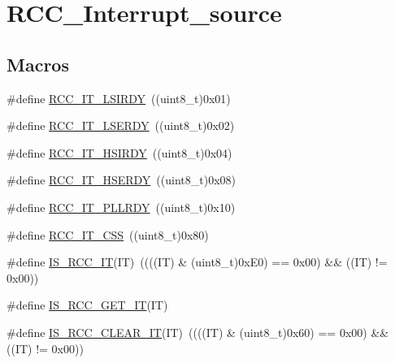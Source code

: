\hypertarget{group___r_c_c___interrupt__source}{}\section{R\+C\+C\+\_\+\+Interrupt\+\_\+source}
\label{group___r_c_c___interrupt__source}
\subsection*{Macros}
\begin{DoxyCompactItemize}
\item 
\#define \mbox{\hyperlink{group___r_c_c___interrupt__source_ga2b4ef277c1b71f96e0bef4b9a72fca94}{R\+C\+C\+\_\+\+I\+T\+\_\+\+L\+S\+I\+R\+DY}}~((uint8\+\_\+t)0x01)
\item 
\#define \mbox{\hyperlink{group___r_c_c___interrupt__source_gad6b6e78a426850f595ef180d292a673d}{R\+C\+C\+\_\+\+I\+T\+\_\+\+L\+S\+E\+R\+DY}}~((uint8\+\_\+t)0x02)
\item 
\#define \mbox{\hyperlink{group___r_c_c___interrupt__source_ga69637e51b71f73f519c8c0a0613d042f}{R\+C\+C\+\_\+\+I\+T\+\_\+\+H\+S\+I\+R\+DY}}~((uint8\+\_\+t)0x04)
\item 
\#define \mbox{\hyperlink{group___r_c_c___interrupt__source_gad13eaede352bca59611e6cae68665866}{R\+C\+C\+\_\+\+I\+T\+\_\+\+H\+S\+E\+R\+DY}}~((uint8\+\_\+t)0x08)
\item 
\#define \mbox{\hyperlink{group___r_c_c___interrupt__source_ga68d48e7811fb58f2649dce6cf0d823d9}{R\+C\+C\+\_\+\+I\+T\+\_\+\+P\+L\+L\+R\+DY}}~((uint8\+\_\+t)0x10)
\item 
\#define \mbox{\hyperlink{group___r_c_c___interrupt__source_ga9bb34a4912d2084dc1c0834eb53aa7a3}{R\+C\+C\+\_\+\+I\+T\+\_\+\+C\+SS}}~((uint8\+\_\+t)0x80)
\item 
\#define \mbox{\hyperlink{group___r_c_c___interrupt__source_ga710d72ccf88ddbec09b033c81a571a83}{I\+S\+\_\+\+R\+C\+C\+\_\+\+IT}}(IT)~((((IT) \& (uint8\+\_\+t)0x\+E0) == 0x00) \&\& ((\+I\+T) != 0x00))
\item 
\#define \mbox{\hyperlink{group___r_c_c___interrupt__source_ga7a1b771d6d9c2d8346ab58a1f046f6a6}{I\+S\+\_\+\+R\+C\+C\+\_\+\+G\+E\+T\+\_\+\+IT}}(IT)
\item 
\#define \mbox{\hyperlink{group___r_c_c___interrupt__source_ga8374741e47d696accd1a72647650ba63}{I\+S\+\_\+\+R\+C\+C\+\_\+\+C\+L\+E\+A\+R\+\_\+\+IT}}(IT)~((((IT) \& (uint8\+\_\+t)0x60) == 0x00) \&\& ((\+I\+T) != 0x00))
\end{DoxyCompactItemize}


